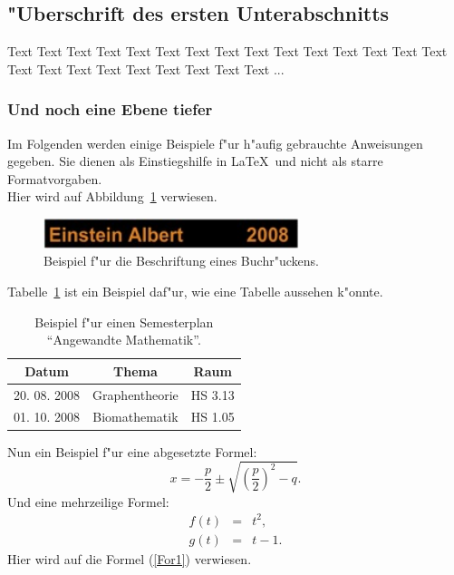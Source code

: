 \documentclass[a4paper,bibtotoc,oneside]{scrbook}
\begin{document}
\subsection[Erster Unterabschnitt]{"Uberschrift des ersten Unterabschnitts}

Text Text Text Text Text Text Text Text Text Text Text Text Text Text Text Text Text Text Text Text Text Text Text Text ...

\subsubsection[Erster Unter-Unterabschnitt]{Und noch eine Ebene tiefer} 

Im Folgenden werden einige Beispiele f"ur h"aufig gebrauchte Anweisungen gegeben. Sie dienen als Einstiegshilfe in \LaTeX\ und 
nicht als starre Formatvorgaben.  
\\[2\baselineskip]
Hier wird auf Abbildung~\ref{Abb1} verwiesen. 
\begin{figure}[htbp]
\centering
\includegraphics[width=75mm]{Buchruecken}
\caption[Beschriftung eines Buchr"uckens.]{Beispiel f"ur die Beschriftung eines Buchr"uckens.}\label{Abb1}
\end{figure}
Tabelle~\ref{Tab1} ist ein Beispiel daf"ur, wie eine Tabelle aussehen k"onnte.
\begin{table}[htbp]
\centering
\begin{tabular}{ | c | c | c | }\hline
{\bf Datum} & {\bf Thema} & {\bf Raum}\\ \hline
\hline
20. 08. 2008 & Graphentheorie & HS 3.13\\ \hline
01. 10. 2008 & Biomathematik & HS 1.05\\ \hline
\end{tabular}
\caption[Semesterplan "`Angewandte Mathematik"'.]{Beispiel f"ur einen Semesterplan "`Angewandte Mathematik"'.}\label{Tab1}
\end{table}

\noindent
Nun ein Beispiel f"ur eine abgesetzte Formel:
\begin{equation}
x =  - \frac{p}{2} \pm \sqrt{\left(\frac{p}{2}\right)^2 - q}.
\end{equation}
Und eine mehrzeilige Formel:
\begin{eqnarray}
f(t)&=& t^2 \label{For1},\\
g(t) &=& t-1.
\end{eqnarray}
Hier wird auf die Formel (\ref{For1}) verwiesen. \\
\end{document}
